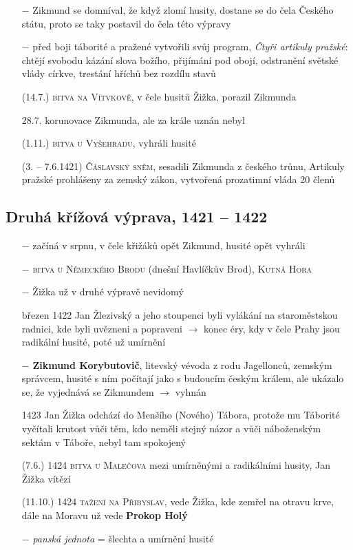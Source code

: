 \documentclass{article}
\begin{document}
\begin{itemize}
    \vspace{-0.5em}
    \setlength\itemsep{0.15em}
    \item[$-$] Zikmund se domníval, že když zlomí husity, dostane se do čela Českého státu, proto se taky postavil do čela této výpravy
    \item[$-$] před boji táborité a pražené vytvořili svůj program, \textit{Čtyři artikuly pražské}: chtějí svobodu kázání slova božího, přijímání pod obojí, odstranění světské vlády církve, trestání hříchů bez rozdílu stavů
    \item[(14.7.)] \textsc{bitva na Vítvkově}, v čele husitů Žižka, porazil Zikmunda
    \item[28.7.] korunovace Zikmunda, ale za krále uznán nebyl
    \item[(1.11.)] \textsc{bitva u Vyšehradu}, vyhráli husité
    \item[(3. -- 7.6.1421)] \textsc{Čáslavský sněm}, sesadili Zikmunda z českého trůnu, Artikuly pražské prohlášeny za zemský zákon, vytvořená prozatimní vláda 20 členů
\end{itemize}

\subsection*{Druhá křížová výprava, 1421 -- 1422}
\begin{itemize}
    \vspace{-0.5em}
    \setlength\itemsep{0.15em}
    \item[$-$] začíná v srpnu, v čele křižáků opět Zikmund, husité opět vyhráli
    \item[$-$] \textsc{bitva u Německého Brodu} (dnešní Havlíčkův Brod), \textsc{Kutná Hora}
    \item[$-$] Žižka už v druhé výpravě nevidomý
    \item[březen 1422] Jan Žlezivský a jeho stoupenci byli vylákání na staroměstskou radnici, kde byli uvězneni a popraveni $\rightarrow$ konec éry, kdy v čele Prahy jsou radikální husité, poté už umírnění
    \item[$-$] \textbf{Zikmund Korybutovič}, litevský vévoda z rodu Jagellonců, zemským správcem, husité s ním počítají jako s budoucím českým králem, ale ukázalo se, že vyjednává se Zikmundem $\rightarrow$ vyhnán
    \item[1423] Jan Žižka odchází do Menšího (Nového) Tábora, protože mu Táborité vyčítali krutost vůči těm, kdo neměli stejný názor a vůči náboženským sektám v Táboře, nebyl tam spokojený
    \item[(7.6.) 1424] \textsc{bitva u Malečova} mezi umírněnými a radikálními husity, Jan Žižka vítězí
    \item[(11.10.) 1424] \textsc{tažení na Přibyslav}, vede Žižka, kde zemřel na otravu krve, dále na Moravu už vede \textbf{Prokop Holý}
    \item[$-$] \textit{panská jednota} = šlechta a umírnění husité
\end{itemize}
\end{document}
